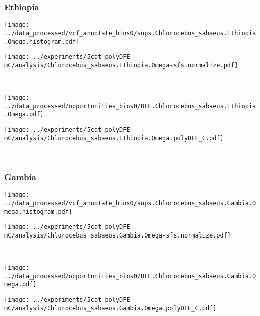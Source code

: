 \subsubsection{Ethiopia}

\begin{minipage}{0.49\linewidth}
    \texttt{[image: ../data\_processed/vcf\_annotate\_bins0/snps.Chlorocebus\_sabaeus.Ethiopia.Omega.histogram.pdf]}
\end{minipage}
\begin{minipage}{0.49\linewidth}
    \texttt{[image: ../experiments/5cat-polyDFE-mC/analysis/Chlorocebus\_sabaeus.Ethiopia.Omega-sfs.normalize.pdf]}
\end{minipage}
\\
\begin{minipage}{0.49\linewidth}
    \texttt{[image: ../data\_processed/opportunities\_bins0/DFE.Chlorocebus\_sabaeus.Ethiopia.Omega.pdf]}
\end{minipage}
\begin{minipage}{0.49\linewidth}
    \texttt{[image: ../experiments/5cat-polyDFE-mC/analysis/Chlorocebus\_sabaeus.Ethiopia.Omega.polyDFE\_C.pdf]}
\end{minipage}
\\

\subsubsection{Gambia}

\begin{minipage}{0.49\linewidth}
    \texttt{[image: ../data\_processed/vcf\_annotate\_bins0/snps.Chlorocebus\_sabaeus.Gambia.Omega.histogram.pdf]}
\end{minipage}
\begin{minipage}{0.49\linewidth}
    \texttt{[image: ../experiments/5cat-polyDFE-mC/analysis/Chlorocebus\_sabaeus.Gambia.Omega-sfs.normalize.pdf]}
\end{minipage}
\\
\begin{minipage}{0.49\linewidth}
    \texttt{[image: ../data\_processed/opportunities\_bins0/DFE.Chlorocebus\_sabaeus.Gambia.Omega.pdf]}
\end{minipage}
\begin{minipage}{0.49\linewidth}
    \texttt{[image: ../experiments/5cat-polyDFE-mC/analysis/Chlorocebus\_sabaeus.Gambia.Omega.polyDFE\_C.pdf]}
\end{minipage}
\\

